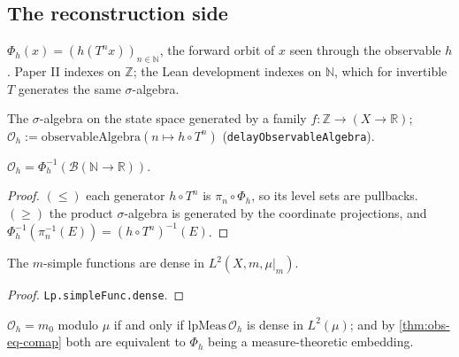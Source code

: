 \subsection{The reconstruction side}

\begin{definition}
  \label{def:delay-map}
  \leanok
  $\Phi_h(x) = (h(T^n x))_{n \in \mathbb{N}}$, the forward orbit of $x$ seen
  through the observable $h$. Paper II indexes on $\mathbb{Z}$; the Lean
  development indexes on $\mathbb{N}$, which for invertible $T$ generates the
  same $\sigma$-algebra.
\end{definition}

\begin{definition}
  \label{def:observable-algebra}
  \leanok
  The $\sigma$-algebra on the state space generated by a family
  $f : \mathbb{Z} \to (X \to \mathbb{R})$;
  $\mathcal{O}_h := \mathrm{observableAlgebra}(n \mapsto h \circ T^{n})$
  (\texttt{delayObservableAlgebra}).
\end{definition}

\begin{theorem}
  \label{thm:obs-eq-comap}
  \leanok
  $\mathcal{O}_h = \Phi_h^{-1}(\mathcal{B}(\mathbb{N} \to \mathbb{R}))$.
\end{theorem}

\begin{proof}
  \leanok
  $(\le)$ each generator $h \circ T^{n}$ is $\pi_n \circ \Phi_h$, so its level
  sets are pullbacks. $(\ge)$ the product $\sigma$-algebra is generated by the
  coordinate projections, and $\Phi_h^{-1}(\pi_n^{-1}(E)) = (h \circ T^n)^{-1}(E)$.
\end{proof}

\begin{theorem}
  \label{thm:density-bridge}
  \leanok
  The $m$-simple functions are dense in $L^2(X, m, \mu|_m)$.
\end{theorem}

\begin{proof}
  \leanok
  \texttt{Lp.simpleFunc.dense}.
\end{proof}

\begin{theorem}
  \label{thm:reconstruction}
  \leanok
  $\mathcal{O}_h = m_0$ modulo $\mu$ if and only if
  $\mathrm{lpMeas}\,\mathcal{O}_h$ is dense in $L^2(\mu)$; and by
  \ref{thm:obs-eq-comap} both are equivalent to $\Phi_h$ being a
  measure-theoretic embedding.
\end{theorem}

